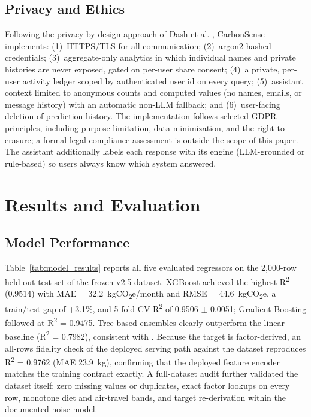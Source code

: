 \documentclass[conference]{IEEEtran}
\begin{document}
\subsection{Privacy and Ethics}

Following the privacy-by-design approach of Dash et al. \cite{dash2025}, CarbonSense implements: (1)~HTTPS/TLS for all communication; (2)~argon2-hashed credentials; (3)~aggregate-only analytics in which individual names and private histories are never exposed, gated on per-user share consent; (4)~a private, per-user activity ledger scoped by authenticated user id on every query; (5)~assistant context limited to anonymous counts and computed values (no names, emails, or message history) with an automatic non-LLM fallback; and (6)~user-facing deletion of prediction history. The implementation follows selected GDPR principles, including purpose limitation, data minimization, and the right to erasure; a formal legal-compliance assessment is outside the scope of this paper. The assistant additionally labels each response with its engine (LLM-grounded or rule-based) so users always know which system answered.

\FloatBarrier

\section{Results and Evaluation}

\subsection{Model Performance}

Table~\ref{tab:model_results} reports all five evaluated regressors on the 2,000-row held-out test set of the frozen v2.5 dataset. XGBoost achieved the highest R\textsuperscript{2} (0.9514) with MAE = 32.2~kgCO\textsubscript{2}e/month and RMSE = 44.6~kgCO\textsubscript{2}e, a train/test gap of +3.1\%, and 5-fold CV R\textsuperscript{2} of 0.9506 $\pm$ 0.0051; Gradient Boosting followed at R\textsuperscript{2} = 0.9475. Tree-based ensembles clearly outperform the linear baseline (R\textsuperscript{2} = 0.7982), consistent with \cite{swathi2025}. Because the target is factor-derived, an all-rows fidelity check of the deployed serving path against the dataset reproduces R\textsuperscript{2} = 0.9762 (MAE 23.9~kg), confirming that the deployed feature encoder matches the training contract exactly. A full-dataset audit further validated the dataset itself: zero missing values or duplicates, exact factor lookups on every row, monotone diet and air-travel bands, and target re-derivation within the documented noise model.
\end{document}
